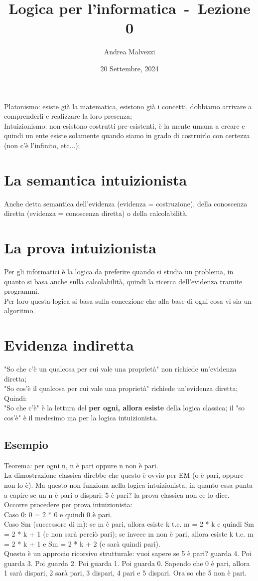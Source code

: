 \documentclass[12pt]{article}
\author{Andrea Malvezzi}
\title{\textbf{Logica per l'informatica~-~Lezione 0}}
\date{20 Settembre, 2024}
\begin{document}
\maketitle
\pagebreak
\tableofcontents
\pagebreak
Platonismo: esiste già la matematica, esistono già i concetti, dobbiamo arrivare a comprenderli e realizzare la loro presenza; \\
Intuizionismo: non esistono costrutti pre-esistenti, è la mente umana a creare e quindi un ente esiste solamente quando siamo in grado di costruirlo con certezza (non c'è l'infinito, etc...);
\section{La semantica intuizionista}
Anche detta semantica dell'evidenza (evidenza = costruzione), della conoscenza diretta (evidenza = conoscenza diretta) o della calcolabilità.
\section{La prova intuizionista}
Per gli informatici è la logica da preferire quando si studia un problema, in quanto si basa anche sulla calcolabilità, quindi la ricerca dell'evidenza tramite programmi. \\
Per loro questa logica si basa sulla concezione che alla base di ogni cosa vi sia un algoritmo.
\section{Evidenza indiretta}
"So che c'è un qualcosa per cui vale una proprietà" non richiede un'evidenza diretta; \\
"So cos'è il qualcosa per cui vale una proprietà" richiede un'evidenza diretta; \\
Quindi: \\
"So che c'è" è la lettura del \textbf{per ogni, allora esiste} della logica classica; il "so cos'è" è il medesimo ma per la logica intuizionista.
\subsection{Esempio}
Teorema: per ogni n, n è pari oppure n non è pari. \\
La dimostrazione classica direbbe che questo è ovvio per EM (o è pari, oppure non lo è). Ma questo non funziona nella logica intuizionista, in quanto essa punta a capire se un n è pari o dispari:
5 è pari? la prova classica non ce lo dice. Occorre procedere per prova intuizionista: \\
Caso 0: 0 = 2 * 0 e quindi 0 è pari. \\
Caso Sm (successore di m): se m è pari, allora esiste k t.c. m = 2 * k e quindi Sm = 2 * k + 1 (e non sarà perciò pari); se invece m non è pari, allora esiste k t.c. m = 2 * k + 1 e Sm = 2 * k + 2 (e sarà quindi pari). \\
Questo è un approcio ricorsivo strutturale: vuoi sapere se 5 è pari? guarda 4. Poi guarda 3. Poi guarda 2. Poi guarda 1. Poi guarda 0. Sapendo che 0 è pari, allora 1 sarà dispari, 2 sarà pari, 3 dispari, 4 pari e 5 dispari. Ora so che 5 non è pari. 
\end{document}
